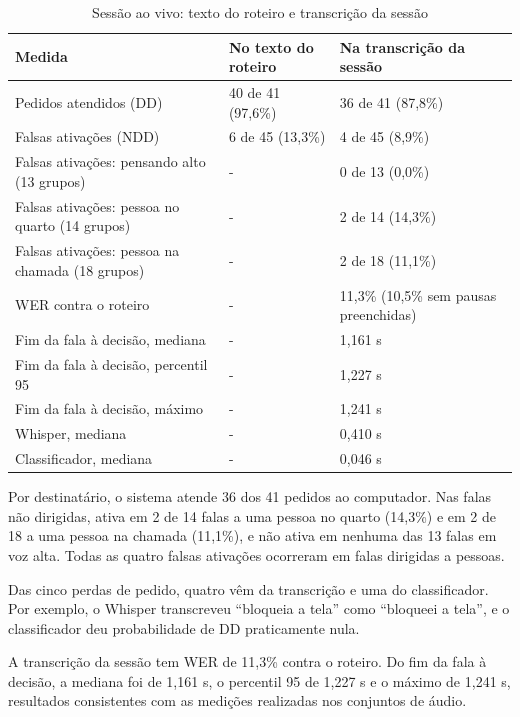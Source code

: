 \documentclass[
    12pt,                %
    openright,           %
    oneside,             %
    a4paper,             %
    english,             %
    brazil               %
]{abntex2}
\begin{document}
\begin{table}[htb]
\centering
\caption{Sessão ao vivo: texto do roteiro e transcrição da sessão}
\label{tab:sessao}
\small
\begin{tabularx}{\textwidth}{ZYY}
\toprule
Medida & No texto do roteiro & Na transcrição da sessão \\
\midrule
Pedidos atendidos (DD) & 40 de 41 (97,6\%) & 36 de 41 (87,8\%) \\
Falsas ativações (NDD) & 6 de 45 (13,3\%) & 4 de 45 (8,9\%) \\
Falsas ativações: pensando alto (13 grupos) & - & 0 de 13 (0,0\%) \\
Falsas ativações: pessoa no quarto (14 grupos) & - & 2 de 14 (14,3\%) \\
Falsas ativações: pessoa na chamada (18 grupos) & - & 2 de 18 (11,1\%) \\
WER contra o roteiro & - & 11,3\% (10,5\% sem pausas preenchidas) \\
Fim da fala à decisão, mediana & - & 1,161 s \\
Fim da fala à decisão, percentil 95 & - & 1,227 s \\
Fim da fala à decisão, máximo & - & 1,241 s \\
Whisper, mediana & - & 0,410 s \\
Classificador, mediana & - & 0,046 s \\
\bottomrule
\end{tabularx}
\end{table}

Por destinatário, o sistema atende 36 dos 41 pedidos ao computador. Nas falas não dirigidas, ativa em 2 de 14 falas a uma pessoa no quarto (14,3\%) e em 2 de 18 a uma pessoa na chamada (11,1\%), e não ativa em nenhuma das 13 falas em voz alta. Todas as quatro falsas ativações ocorreram em falas dirigidas a pessoas.

Das cinco perdas de pedido, quatro vêm da transcrição e uma do classificador. Por exemplo, o Whisper transcreveu ``bloqueia a tela'' como ``bloqueei a tela'', e o classificador deu probabilidade de DD praticamente nula. 

A transcrição da sessão tem WER de 11,3\% contra o roteiro. Do fim da fala à decisão, a mediana foi de 1,161 s, o percentil 95 de 1,227 s e o máximo de 1,241 s, resultados consistentes com as medições realizadas nos conjuntos de áudio.

\end{document}
